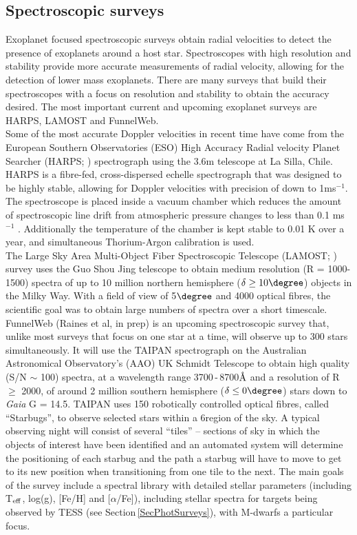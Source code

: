 \subsection{Spectroscopic surveys}
\label{SecSpecSurveys}
Exoplanet focused spectroscopic surveys obtain radial velocities to detect the presence of exoplanets around a host star. Spectroscopes with high resolution and stability provide more accurate measurements of radial velocity, allowing for the detection of lower mass exoplanets. There are many surveys that build their spectroscopes with a focus on resolution and stability to obtain the accuracy desired. The most important current and upcoming exoplanet surveys are HARPS, LAMOST and FunnelWeb.\\

Some of the most accurate Doppler velocities in recent time have come from the European Southern Observatories (ESO) High Accuracy Radial velocity Planet Searcher (HARPS; \citealt{2003Mayor}) spectrograph using the 3.6m telescope at La Silla, Chile. HARPS is a fibre-fed, cross-dispersed echelle spectrograph that was designed to be highly stable, allowing for Doppler velocities with precision of down to 1ms$^{-1}$. The spectroscope is placed inside a vacuum chamber which reduces the amount of spectroscopic line drift from atmospheric pressure changes to less than 0.1 ms$^{-1}$ \citep{2004Rupprecht}. Additionally the temperature of the chamber is kept stable to 0.01 K over a year, and simultaneous Thorium-Argon calibration is used.\\

The Large Sky Area Multi-Object Fiber Spectroscopic Telescope (LAMOST; \citealt{2012Cui}) survey uses the Guo Shou Jing telescope to obtain medium resolution (R = 1000-1500) spectra of up to 10 million northern hemisphere ($\delta \geq 10\degree$) objects in the Milky Way. With a field of view of 5$\degree$ and 4000 optical fibres, the scientific goal was to obtain large numbers of spectra over a short timescale.\\

FunnelWeb (Raines et al, in prep) is an upcoming spectroscopic survey that, unlike most surveys that focus on one star at a time, will observe up to 300 stars simultaneously. It will use the TAIPAN spectrograph \citep{2014Kuehn} on the Australian Astronomical Observatory's (AAO) UK Schmidt Telescope to obtain high quality (S/N $\sim$ 100) spectra, at a wavelength range 3700\,-\,8700$\hbox{\AA}$ and a resolution of R $\geq$ 2000, of around 2 million southern hemisphere ($\delta \leq 0\degree$) stars down to {\em Gaia} G = 14.5. TAIPAN uses 150 robotically controlled optical fibres, called ``Starbugs'', to observe selected stars within a 6\degree region of the sky. A typical observing night will consist of several ``tiles'' -- sections of sky in which the objects of interest have been identified and an automated system will determine the positioning of each starbug and the path a starbug will have to move to get to its new position when transitioning from one tile to the next. The main goals of the survey include a spectral library with detailed stellar parameters (including T$_{\rm eff}$, log(g), [Fe/H] and [$\alpha$/Fe]), including stellar spectra for targets being observed by TESS (see Section\,\ref{SecPhotSurveys}), with M-dwarfs a particular focus. 
